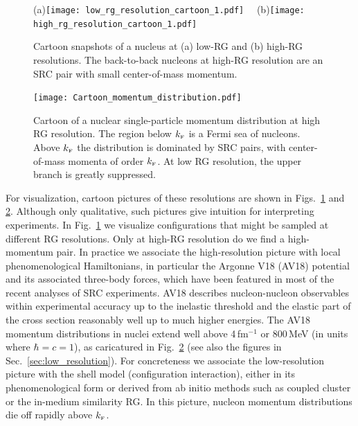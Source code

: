 \documentclass[10pt,aps,prc,floatfix,twocolumn,nofootinbib]{revtex4-1}
\begin{document}
\begin{figure}[tbh]
    \centering
    (a)\texttt{[image: low\_rg\_resolution\_cartoon\_1.pdf]}~~%
    (b)\texttt{[image: high\_rg\_resolution\_cartoon\_1.pdf]}
    \caption{Cartoon snapshots of a nucleus at (a) low-RG  and (b) high-RG resolutions. 
    The back-to-back nucleons at high-RG resolution are an SRC pair with small center-of-mass momentum.
    }
    \label{fig:cartoon_nuclei}
\end{figure}

\begin{figure}[tbh]
    \centering
    \texttt{[image: Cartoon\_momentum\_distribution.pdf]}
    \caption{Cartoon of a nuclear single-particle momentum distribution at high RG resolution.
    The region below $k_{\scriptscriptstyle{\text F}}$ is a Fermi sea of nucleons.
    Above $k_{\scriptscriptstyle{\text F}}$ the distribution is dominated by SRC pairs, with center-of-mass momenta of order $k_{\scriptscriptstyle{\text F}}$.
    At low RG resolution, the upper branch is greatly suppressed.
    }
    \label{fig:cartoon_mom_dist}
\end{figure}

For visualization, cartoon pictures of these resolutions are shown in Figs.~\ref{fig:cartoon_nuclei} and \ref{fig:cartoon_mom_dist}.
Although only qualitative, such pictures give intuition for interpreting experiments.
In Fig.~\ref{fig:cartoon_nuclei} we visualize configurations that might be sampled at different RG resolutions. Only at high-RG resolution do we find a high-momentum pair.
In practice we associate the high-resolution picture with local phenomenological Hamiltonians, in particular the Argonne V18 (AV18) potential~\cite{Wiringa:1994wb} and its associated three-body forces, which have been featured in most of the recent analyses of SRC experiments. 
AV18 describes nucleon-nucleon observables within experimental accuracy up to the inelastic threshold and the elastic part of the cross section reasonably well up to much higher energies.
The AV18 momentum distributions in nuclei extend well above 4\,fm$^{-1}$ or 800\,MeV (in units where $\hbar = c = 1$), as caricatured in Fig.~\ref{fig:cartoon_mom_dist} (see also the figures in Sec.~\ref{sec:low_resolution}).
For concreteness we associate the low-resolution picture with the shell model (configuration interaction), either in its phenomenological form or derived from ab initio methods such as coupled cluster or the in-medium similarity RG.
In this picture, nucleon momentum distributions die off rapidly above $k_{\scriptscriptstyle{\text F}}$.
\end{document}
